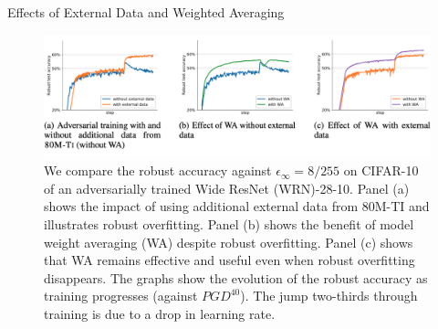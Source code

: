 \begin{frame}{Effects of External Data and Weighted Averaging}
    \begin{figure}
        \centering
        \includegraphics[height=.4\textheight]{pic/ED_WA.png}
        \caption{We compare the robust accuracy against $\epsilon_\infty = 8/255$ on CIFAR-10 of an adversarially trained Wide ResNet (WRN)-28-10. Panel (a) shows the impact of using additional external data from 80M-TI and illustrates robust overfitting. Panel (b) shows the benefit of model weight averaging (WA) despite robust overfitting. Panel (c) shows that WA remains effective and useful even when robust overfitting disappears. The graphs show the evolution of the robust accuracy as training progresses (against $PGD^{40}$). The jump two-thirds through training is due to a drop in learning rate.}
        \label{fig:ED_WA}
    \end{figure}
\end{frame}